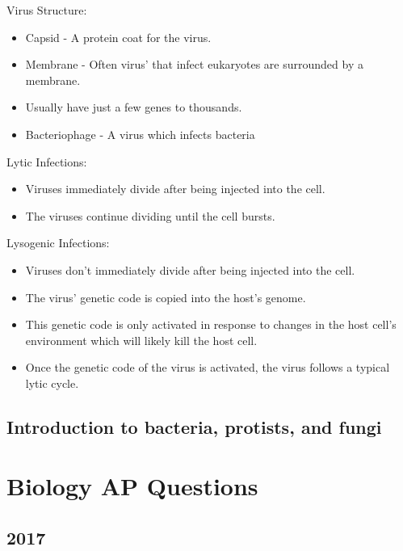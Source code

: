 \documentclass{article}
\begin{document}
Virus Structure:
\begin{itemize}
\item Capsid - A protein coat for the virus.
\item Membrane - Often virus' that infect eukaryotes are surrounded by a membrane.
\item Usually have just a few genes to thousands.
\item Bacteriophage - A virus which infects bacteria
\end{itemize}
Lytic Infections:
\begin{itemize}
\item Viruses immediately divide after being injected into the cell.
\item The viruses continue dividing until the cell bursts.
\end{itemize}
Lysogenic Infections:
\begin{itemize}
\item Viruses don't immediately divide after being injected into the cell.
\item The virus' genetic code is copied into the host's genome.
\item This genetic code is only activated in response to changes in the host cell's environment which will likely kill the
host cell.
\item Once the genetic code of the virus is activated, the virus follows a typical lytic cycle.
\end{itemize}

\subsection{Introduction to bacteria, protists, and fungi}

\section{Biology AP Questions}

\subsection{2017}
\end{document}
